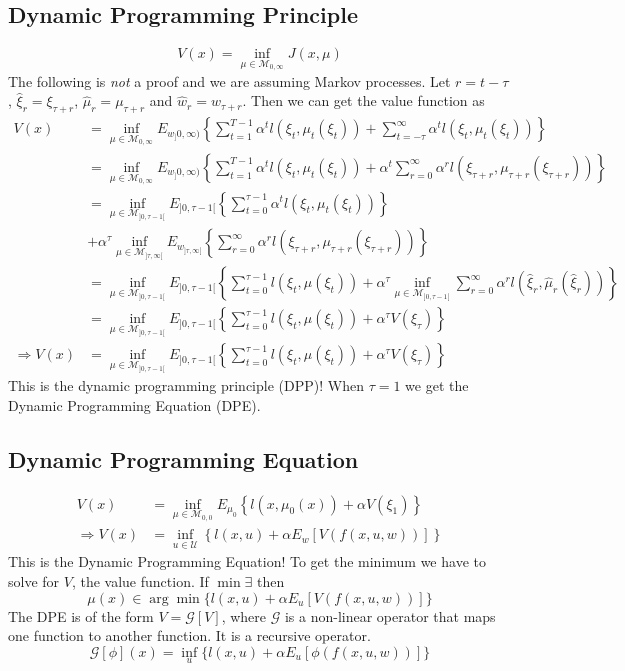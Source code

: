 \subsection{Dynamic Programming Principle}
$$V(x) = \inf_{\mu\in\mathcal{M}_{0,\infty}} J(x,\mu)$$
The following is \textit{not} a proof and we are assuming Markov processes. Let $r=t-\tau$, $\hat{\xi}_r=\xi_{\tau+r}$, $\hat{\mu}_r=\mu_{\tau+r}$ and $\hat{w}_r=w_{\tau+r}$. Then we can get the value function as
\begin{align}
V(x) &= \inf_{\mu\in\mathcal{M}_{0,\infty}} E_{w_]0,\infty)} \left\lbrace \sum_{t=1}^{T-1} \alpha^tl(\xi_t,\mu_t(\xi_t)) + \sum_{t=-\tau}^\infty \alpha^tl(\xi_t,\mu_t(\xi_t))\right\rbrace \nonumber \\
&= \inf_{\mu\in\mathcal{M}_{0,\infty}} E_{w_]0,\infty)} \left\lbrace \sum_{t=1}^{T-1} \alpha^tl(\xi_t,\mu_t(\xi_t)) +  \alpha^t \sum_{r=0}^\infty \alpha^rl(\xi_{\tau+r},\mu_{\tau+r}(\xi_{\tau+r})) \right\rbrace \nonumber \\
&= \inf_{\mu\in\mathcal{M}_{]0,\tau-1[}} E_{]0,\tau-1[} \left\lbrace \sum_{t=0}^{\tau-1} \alpha^tl(\xi_t,\mu_t(\xi_t))\right\rbrace \nonumber \\
&+ \alpha^\tau\inf_{\mu\in\mathcal{M}_{]\tau,\infty[}} E_{w_{]\tau,\infty[}} \left\lbrace \sum_{r=0}^\infty\alpha^rl(\xi_{\tau+r},\mu_{\tau+r}(\xi_{\tau+r}))\right\rbrace \nonumber \\
&= \inf_{\mu\in\mathcal{M}_{]0,\tau-1[}} E_{]0,\tau-1[} \left\lbrace \sum_{t=0}^{\tau-1} l(\xi_t,\mu(\xi_t)) + \alpha^\tau \inf_{\mu\in\mathcal{M}_{]0,\tau-1[}} \sum_{r=0}^\infty \alpha^rl(\hat{\xi}_r,\hat{\mu}_r(\hat{\xi}_r)) \right\rbrace \nonumber \\
&= \inf_{\mu\in\mathcal{M}_{]0,\tau-1[}} E_{]0,\tau-1[} \left\lbrace \sum_{t=0}^{\tau-1} l(\xi_t,\mu(\xi_t)) + \alpha^\tau V(\xi_\tau) \right\rbrace \nonumber \\
\Rightarrow V(x) &= \inf_{\mu\in\mathcal{M}_{]0,\tau-1[}} E_{]0,\tau-1[} \left\lbrace \sum_{t=0}^{\tau-1} l(\xi_t,\mu(\xi_t)) + \alpha^\tau V(\xi_\tau) \right\rbrace
\end{align}
This is the dynamic programming principle (DPP)! When $\tau=1$ we get the Dynamic Programming Equation (DPE).

\subsection{Dynamic Programming Equation}
\begin{align}
V(x) &= \inf_{\mu\in\mathcal{M}_{0,0}} E_{\mu_0} \left\lbrace l(x,\mu_0(x)) + \alpha V(\xi_1) \right\rbrace \nonumber \\
\Rightarrow V(x) &= \inf_{u\in\mathcal{U}} \left\lbrace l(x,u) + \alpha E_w[V(f(x,u,w))] \right\rbrace
\end{align}
This is the Dynamic Programming Equation! To get the minimum we have to solve for $V$, the value function. If $\min\exists$ then
$$\mu(x)\in\arg\min\{l(x,u)+\alpha E_u[V(f(x,u,w))]\}$$
The DPE is of the form $V=\mathcal{G}[V]$, where $\mathcal{G}$ is a non-linear operator that maps one function to another function. It is a recursive operator.
$$\mathcal{G}[\phi](x) = \inf_u\{l(x,u)+\alpha E_u[\phi(f(x,u,w))]\}$$

